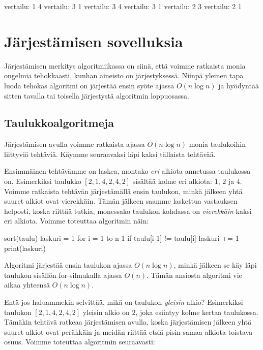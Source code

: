 \begin{code}
vertailu: 1 4
vertailu: 3 1
vertailu: 3 4
vertailu: 3 1
vertailu: 2 3
vertailu: 2 1
\end{code}

\section{Järjestämisen sovelluksia}

Järjestämisen merkitys algoritmiikassa on siinä,
että voimme ratkaista monia ongelmia tehokkaasti, 
kunhan aineisto on järjestyksessä.
Niinpä yleinen tapa luoda tehokas algoritmi on järjestää
ensin syöte ajassa $O(n \log n)$ ja hyödyntää sitten
tavalla tai toisella järjestystä algoritmin loppuosassa.

\subsection{Taulukkoalgoritmeja}

\label{sec:taukas}

Järjestämisen avulla voimme ratkaista ajassa
$O(n \log n)$ monia taulukoihin liittyviä tehtäviä.
Käymme seuraavaksi läpi kaksi tällaista tehtävää.

Ensimmäinen tehtävämme on laskea,
montako \emph{eri} alkiota annetussa taulukossa on.
Esimerkiksi taulukko $[2,1,4,2,4,2]$ sisältää kolme
eri alkiota: $1$, $2$ ja $4$.
Voimme ratkaista tehtävän järjestämällä ensin taulukon,
minkä jälkeen yhtä suuret alkiot ovat vierekkäin.
Tämän jälkeen saamme laskettua vastauksen helposti,
koska riittää tutkia, monessako taulukon kohdassa on
\emph{vierekkäin} kaksi eri alkiota.
Voimme toteuttaa algoritmin näin:

\begin{code}
sort(taulu)
laskuri = 1
for i = 1 to n-1
    if taulu[i-1] != taulu[i]
        laskuri += 1
print(laskuri)
\end{code}

Algoritmi järjestää ensin taulukon ajassa $O(n \log n)$,
minkä jälkeen se käy läpi taulukon sisällön for-silmukalla
ajassa $O(n)$.
Tämän ansiosta algoritmi vie aikaa yhteensä $O(n \log n)$.


Entä jos haluammekin selvittää, mikä on taulukon \emph{yleisin} alkio?
Esimerkiksi taulukon $[2,1,4,2,4,2]$ yleisin alkio on $2$,
joka esiintyy kolme kertaa taulukossa.
Tämäkin tehtävä ratkeaa järjestämisen avulla, koska
järjestämisen jälkeen yhtä suuret alkiot ovat peräkkäin ja
meidän riittää etsiä pisin samaa alkiota toistava osuus.
Voimme toteuttaa algoritmin seuraavasti:

